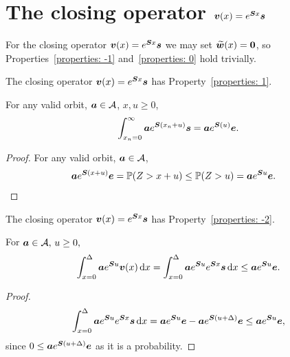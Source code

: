 \section{The closing operator \(\boldsymbol v(x) = e^{\boldsymbol S x}\boldsymbol s\)}
For the closing operator \(\boldsymbol v(x) = e^{\boldsymbol Sx}\boldsymbol s\) we may set \(\widetilde{\boldsymbol w}(x) = \boldsymbol 0\), so Properties~\ref{properties: -1} and~\ref{properties: 0} hold trivially.

\begin{lem}\label{lem: akc}
	The closing operator \(\boldsymbol v(x) = e^{\boldsymbol Sx}\boldsymbol s\) has Property~\ref{properties: 1}.
	
	For any valid orbit, \(\boldsymbol a\in\mathcal A\), \(x,u\geq 0\), 
		\begin{align*}
			\int_{x_n=0}^\infty \boldsymbol a e^{\boldsymbol{S}(x_n+u)}\boldsymbol s = \boldsymbol a e^{\boldsymbol{S}(u)}\boldsymbol e. 
		\end{align*}
	\end{lem}
	\begin{proof}
		For any valid orbit, \(\boldsymbol a\in\mathcal A\), 
			\begin{align*}
					\boldsymbol a e^{\boldsymbol{S}(x+u)}\boldsymbol e &= \mathbb P(Z>x+u) \leq\mathbb P(Z>u) = \boldsymbol a e^{\boldsymbol Su} \boldsymbol e. 
		\end{align*}
	\end{proof}

\begin{cor}
	The closing operator \(\boldsymbol v(x) = e^{\boldsymbol S x}\boldsymbol s\) has Property~\ref{properties: -2}.
	
	For \(\boldsymbol a\in\mathcal A,\, u\geq 0, \)
	\[\int_{x=0}^\Delta \boldsymbol a e^{\boldsymbol Su}\boldsymbol v(x)\, \mathrm{d} x = \int_{x=0}^\Delta \boldsymbol a e^{\boldsymbol Su}e^{\boldsymbol Sx}\boldsymbol s\, \mathrm{d} x \leq \boldsymbol a e^{\boldsymbol Su}\boldsymbol e.\]	
\end{cor}
\begin{proof}
	\[\int_{x=0}^\Delta \boldsymbol a e^{\boldsymbol Su}e^{\boldsymbol Sx}\boldsymbol s\, \mathrm{d} x = \boldsymbol a e^{\boldsymbol Su}\boldsymbol e-\boldsymbol a e^{\boldsymbol S(u+\Delta)}\boldsymbol e \leq \boldsymbol a e^{\boldsymbol Su}\boldsymbol e,\]
	since \(0\leq \boldsymbol a e^{\boldsymbol S(u+\Delta)}\boldsymbol e\) as it is a probability. 
\end{proof}

